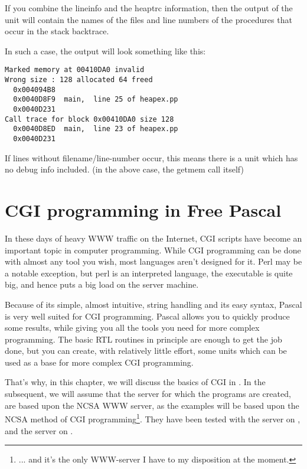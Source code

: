 \documentclass{book}
\begin{document}
If you combine the lineinfo and the heaptrc information, then the output
of the  unit will contain the names of the files and line
numbers of the procedures that occur in the stack backtrace.

In such a case, the output will look something like this:
\begin{verbatim}
Marked memory at 00410DA0 invalid
Wrong size : 128 allocated 64 freed
  0x004094B8
  0x0040D8F9  main,  line 25 of heapex.pp
  0x0040D231
Call trace for block 0x00410DA0 size 128
  0x0040D8ED  main,  line 23 of heapex.pp
  0x0040D231
\end{verbatim}
If lines without filename/line-number occur, this means there is a unit which
has no debug info included. (in the above case, the getmem call itself)


\chapter{CGI programming in Free Pascal}
\label{ch:CGIProgramming}

In these days of heavy WWW traffic on the Internet, CGI scripts have become
an important topic in computer programming. While CGI programming can be
done with almost any tool you wish, most languages aren't designed for it.
Perl may be a notable exception, but perl is an interpreted language, the
executable is quite big, and hence puts a big load on the server machine.

Because of its simple, almost intuitive, string handling and its easy syntax,
Pascal is very well suited for CGI programming. Pascal allows you to quickly
produce some results, while giving you all the tools you need for more
complex programming. The basic RTL routines in principle are enough to get
the job done, but you can create, with relatively little effort, some units
which can be used as a base for more complex CGI programming.

That's why, in this chapter, we will discuss the basics of CGI in \fpc.
In the subsequent, we will assume that the server for which the programs are
created, are based upon the NCSA  WWW server, as the examples
will be based upon the NCSA method of CGI programming\footnote{... and it's
the only WWW-server I have to my disposition at the moment.}.
They have been tested with the  server on \linux, and
the  server on \windowsnt.
\end{document}
